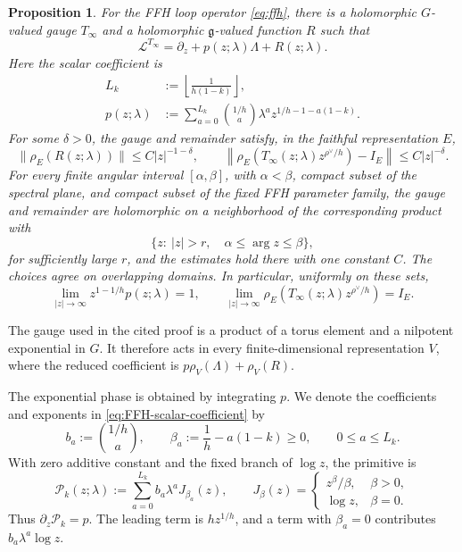 \documentclass[11pt,leqno]{amsart}
\numberwithin{equation}{section}
\theoremstyle{plain}
\newtheorem{proposition}[theorem]{Proposition}
\theoremstyle{definition}
\theoremstyle{plain}
\theoremstyle{definition}
\theoremstyle{remark}
\newcommand{\g}{\mathfrak g}
\begin{document}
\begin{proposition}\label{prop:FFH-gauge-reduction}
For the FFH loop operator \eqref{eq:ffh}, there is a holomorphic $G$-valued gauge $T_\infty$ and a holomorphic $\g$-valued function $R$ such that
\begin{equation}\label{eq:uniform-tensorial-FFH-normal-form}
 \mathcal L^{T_\infty}
 =\partial_z+p(z;\lambda)\Lambda+R(z;\lambda).
\end{equation}
Here the scalar coefficient is
\begin{equation}\label{eq:FFH-scalar-coefficient}
 \begin{aligned}
 L_k&:=\left\lfloor\frac1{h(1-k)}\right\rfloor,\\
 p(z;\lambda)&:=\sum_{a=0}^{L_k}
       \binom{1/h}{a}\lambda^a z^{1/h-1-a(1-k)}.
 \end{aligned}
\end{equation}
For some $\delta>0$, the gauge and remainder satisfy, in the faithful representation $E$,
\begin{equation}\label{eq:FFH-reduction-estimates}
 \|\rho_E(R(z;\lambda))\|\le C|z|^{-1-\delta},\qquad
 \left\|\rho_E\!\left(T_\infty(z;\lambda)z^{\rho^\vee/h}\right)-I_E\right\|
 \le C|z|^{-\delta}.
\end{equation}
For every finite angular interval $[\alpha,\beta]$, with $\alpha<\beta$, compact subset of the spectral plane, and compact subset of the fixed FFH parameter family, the gauge and remainder are holomorphic on a neighborhood of the corresponding product with
\[
 \{z:\ |z|>r,\quad \alpha\le\arg z\le\beta\},
\]
for sufficiently large $r$, and the estimates hold there with one constant $C$.  The choices agree on overlapping domains.  In particular, uniformly on these sets,
\begin{equation}\label{eq:FFH-reduction-limits}
 \lim_{|z|\to\infty}z^{1-1/h}p(z;\lambda)=1,\qquad
 \lim_{|z|\to\infty}
 \rho_E\!\left(T_\infty(z;\lambda)z^{\rho^\vee/h}\right)=I_E.
\end{equation}
\end{proposition}

The gauge used in the cited proof is a product of a torus element and a nilpotent exponential in $G$.  It therefore acts in every finite-dimensional representation $V$, where the reduced coefficient is $p\rho_V(\Lambda)+\rho_V(R)$.

The exponential phase is obtained by integrating $p$.  We denote the coefficients and exponents in \eqref{eq:FFH-scalar-coefficient} by
\[
 b_a:=\binom{1/h}{a},\qquad \beta_a:=\frac1h-a(1-k)\ge0,
 \qquad 0\le a\le L_k.
\]
With zero additive constant and the fixed branch of $\log z$, the primitive is
\begin{equation}\label{eq:FFH-exact-phase-primitive}
 \mathcal P_k(z;\lambda):=\sum_{a=0}^{L_k}b_a\lambda^aJ_{\beta_a}(z),
 \qquad
 J_\beta(z)=
 \begin{cases}z^\beta/\beta,&\beta>0,\\ \log z,&\beta=0.\end{cases}
\end{equation}
Thus $\partial_z\mathcal P_k=p$.  The leading term is $hz^{1/h}$, and a term with $\beta_a=0$ contributes $b_a\lambda^a\log z$.
\end{document}
